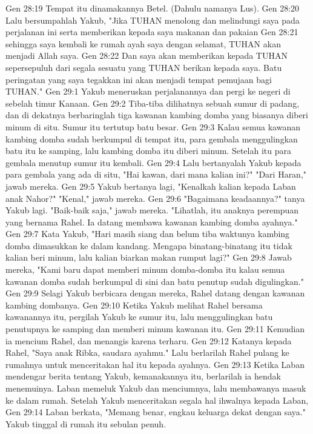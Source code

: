 Gen 28:19  Tempat itu dinamakannya Betel. (Dahulu namanya Lus).
Gen 28:20  Lalu bersumpahlah Yakub, "Jika TUHAN menolong dan melindungi saya pada perjalanan ini serta memberikan kepada saya makanan dan pakaian
Gen 28:21  sehingga saya kembali ke rumah ayah saya dengan selamat, TUHAN akan menjadi Allah saya.
Gen 28:22  Dan saya akan memberikan kepada TUHAN sepersepuluh dari segala sesuatu yang TUHAN berikan kepada saya. Batu peringatan yang saya tegakkan ini akan menjadi tempat pemujaan bagi TUHAN."
Gen 29:1  Yakub meneruskan perjalanannya dan pergi ke negeri di sebelah timur Kanaan.
Gen 29:2  Tiba-tiba dilihatnya sebuah sumur di padang, dan di dekatnya berbaringlah tiga kawanan kambing domba yang biasanya diberi minum di situ. Sumur itu tertutup batu besar.
Gen 29:3  Kalau semua kawanan kambing domba sudah berkumpul di tempat itu, para gembala menggulingkan batu itu ke samping, lalu kambing domba itu diberi minum. Setelah itu para gembala menutup sumur itu kembali.
Gen 29:4  Lalu bertanyalah Yakub kepada para gembala yang ada di situ, "Hai kawan, dari mana kalian ini?" "Dari Haran," jawab mereka.
Gen 29:5  Yakub bertanya lagi, "Kenalkah kalian kepada Laban anak Nahor?" "Kenal," jawab mereka.
Gen 29:6  "Bagaimana keadaannya?" tanya Yakub lagi. "Baik-baik saja," jawab mereka. "Lihatlah, itu anaknya perempuan yang bernama Rahel. Ia datang membawa kawanan kambing domba ayahnya."
Gen 29:7  Kata Yakub, "Hari masih siang dan belum tiba waktunya kambing domba dimasukkan ke dalam kandang. Mengapa binatang-binatang itu tidak kalian beri minum, lalu kalian biarkan makan rumput lagi?"
Gen 29:8  Jawab mereka, "Kami baru dapat memberi minum domba-domba itu kalau semua kawanan domba sudah berkumpul di sini dan batu penutup sudah digulingkan."
Gen 29:9  Selagi Yakub berbicara dengan mereka, Rahel datang dengan kawanan kambing dombanya.
Gen 29:10  Ketika Yakub melihat Rahel bersama kawanannya itu, pergilah Yakub ke sumur itu, lalu menggulingkan batu penutupnya ke samping dan memberi minum kawanan itu.
Gen 29:11  Kemudian ia mencium Rahel, dan menangis karena terharu.
Gen 29:12  Katanya kepada Rahel, "Saya anak Ribka, saudara ayahmu." Lalu berlarilah Rahel pulang ke rumahnya untuk menceritakan hal itu kepada ayahnya.
Gen 29:13  Ketika Laban mendengar berita tentang Yakub, kemanakannya itu, berlarilah ia hendak menemuinya. Laban memeluk Yakub dan menciumnya, lalu membawanya masuk ke dalam rumah. Setelah Yakub menceritakan segala hal ihwalnya kepada Laban,
Gen 29:14  Laban berkata, "Memang benar, engkau keluarga dekat dengan saya." Yakub tinggal di rumah itu sebulan penuh.

